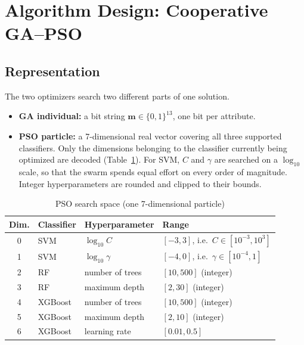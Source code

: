 \documentclass[MTech]{ugthesis}
\begin{document}
\section{Algorithm Design: Cooperative GA--PSO}
\subsection{Representation}
The two optimizers search two different parts of one solution.
\begin{itemize}
\item \textbf{GA individual:} a bit string $\mathbf{m}\in\{0,1\}^{13}$, one bit per attribute.
\item \textbf{PSO particle:} a 7-dimensional real vector covering all three supported classifiers. Only the dimensions belonging to the classifier currently being optimized are decoded (Table~\ref{tab:bounds}). For SVM, $C$ and $\gamma$ are searched on a $\log_{10}$ scale, so that the swarm spends equal effort on every order of magnitude. Integer hyperparameters are rounded and clipped to their bounds.
\end{itemize}

\begin{table}[htpb]
\small
\renewcommand{\arraystretch}{1.25}
\caption{PSO search space (one 7-dimensional particle)}
\label{tab:bounds}
\begin{tabular}{|c|p{2.4cm}|p{4.2cm}|p{4.4cm}|}
\hline
\textbf{Dim.} & \textbf{Classifier} & \textbf{Hyperparameter} & \textbf{Range} \\ \hline
0 & SVM & $\log_{10} C$ & $[-3, 3]$, i.e.\ $C\in[10^{-3},10^{3}]$ \\ \hline
1 & SVM & $\log_{10}\gamma$ & $[-4, 0]$, i.e.\ $\gamma\in[10^{-4},1]$ \\ \hline
2 & RF & number of trees & $[10, 500]$ (integer) \\ \hline
3 & RF & maximum depth & $[2, 30]$ (integer) \\ \hline
4 & XGBoost & number of trees & $[10, 500]$ (integer) \\ \hline
5 & XGBoost & maximum depth & $[2, 10]$ (integer) \\ \hline
6 & XGBoost & learning rate & $[0.01, 0.5]$ \\ \hline
\end{tabular}
\end{table}
\end{document}
